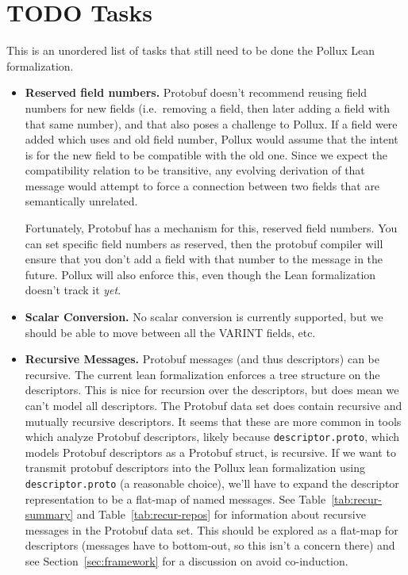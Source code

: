 \section{TODO Tasks}\label{sec:TODO}

This is an unordered list of tasks that still need to be done the Pollux Lean
formalization.

\begin{itemize}
\item \textbf{Reserved field numbers.} Protobuf doesn't recommend reusing field
  numbers for new fields (i.e.\ removing a field, then later adding a field with
  that same number), and that also poses a challenge to Pollux. If a field were
  added which uses and old field number, Pollux would assume that the intent is
  for the new field to be compatible with the old one. Since we expect the
  compatibility relation to be transitive, any evolving derivation of that
  message would attempt to force a connection between two fields that are
  semantically unrelated.

  Fortunately, Protobuf has a mechanism for this, reserved field numbers. You
  can set specific field numbers as reserved, then the protobuf compiler will
  ensure that you don't add a field with that number to the message in the
  future. Pollux will also enforce this, even though the Lean formalization
  doesn't track it \emph{yet}.

\item \textbf{Scalar Conversion.} No scalar conversion is currently supported,
  but we should be able to move between all the VARINT fields, etc.

\item \textbf{Recursive Messages.} Protobuf messages (and thus descriptors) can
  be recursive. The current lean formalization enforces a tree structure on the
  descriptors. This is nice for recursion over the descriptors, but does mean we
  can't model all descriptors. The Protobuf data set does contain recursive and
  mutually recursive descriptors. It seems that these are more common in tools
  which analyze Protobuf descriptors, likely because \texttt{descriptor.proto},
  which models Protobuf descriptors as a Protobuf struct, is recursive. If we
  want to transmit protobuf descriptors into the Pollux lean formalization using
  \texttt{descriptor.proto} (a reasonable choice), we'll have to expand the
  descriptor representation to be a flat-map of named messages. See
  Table~\ref{tab:recur-summary} and Table~\ref{tab:recur-repos} for information
  about recursive messages in the Protobuf data set. This should be explored as
  a flat-map for descriptors (messages have to bottom-out, so this isn't a
  concern there) and see Section~\ref{sec:framework} for a discussion on avoid
  co-induction.


\end{itemize}
